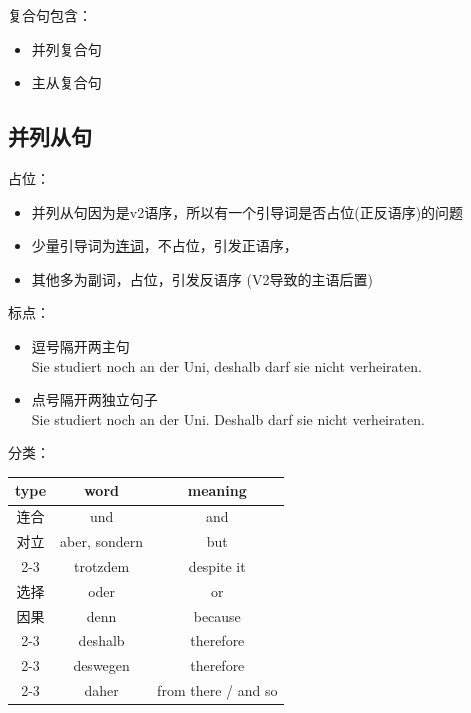 复合句包含：
\begin{itemize}
    \item 并列复合句
    \item 主从复合句
\end{itemize}

\subsection{并列从句}

占位：
\begin{itemize}
    \item 并列从句因为是v2语序，所以有一个引导词是否占位(正反语序)的问题
    \item 少量引导词为\hyperref[sec:conj:und]{连词}，不占位，引发正语序，
    \item 其他多为副词，占位，引发反语序 (V2导致的主语后置)
\end{itemize}

标点：
\begin{itemize}
    \item 逗号隔开两主句 \\
          Sie studiert noch an der Uni, deshalb darf sie nicht verheiraten.
    \item 点号隔开两独立句子 \\
          Sie studiert noch an der Uni. Deshalb darf sie nicht verheiraten.
\end{itemize}

分类：
\begin{center}
    \begin{tabular}{|c|c|c|}
        \hline
        \rowcolor{gray}
        type                & word          & meaning             \\
        \hline
        \multirow{1}{*}{连合} & und           & and                 \\
        \hline
        \multirow{1}{*}{对立} & aber, sondern & but                 \\
        \cline{2-3}
                            & trotzdem      & despite it          \\
        \hline
        \multirow{1}{*}{选择} & oder          & or                  \\
        \hline
        \multirow{1}{*}{因果} & denn          & because             \\
        \cline{2-3}
                            & deshalb       & therefore           \\
        \cline{2-3}
                            & deswegen      & therefore           \\
        \cline{2-3}
                            & daher         & from there / and so \\
        \hline
    \end{tabular}
\end{center}

